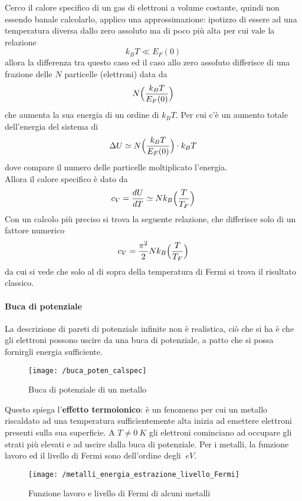 Cerco il calore specifico di un gas di elettroni a volume costante, quindi non essendo banale calcolarlo, applico una approssimazione: ipotizzo di essere ad una temperatura diversa dallo zero assoluto ma di poco più alta per cui vale la relazione
$$k_B T \ll E_F(0)$$
allora la differenza tra questo caso ed il caso allo zero assoluto differisce di una frazione delle $N$ particelle (elettroni) data da 
\begin{equation}
N \Bigl(  \frac{k_B T}{E_F(0)}  \Bigr)
\end{equation}
che aumenta la sua energia di un ordine di $k_BT$.
Per cui c'è un aumento totale dell'energia del sistema di
\begin{equation}
\Delta U \simeq N \Bigl(  \frac{k_B T}{E_F(0)}  \Bigr) \cdot k_B T
\end{equation}
dove compare il numero delle particelle moltiplicato l'energia. \\
Allora il calore specifico è dato da
\begin{equation}
c_V =  \frac{dU}{dT} \simeq N k_B \Bigl(  \frac{T}{T_F}  \Bigr)
\end{equation}
Con un calcolo più preciso si trova la seguente relazione, che differisce solo di un fattore numerico
\begin{equation}
c_V = \frac{\pi^2}{2} N k_B \Bigl(  \frac{T}{T_F}  \Bigr)
\end{equation}
da cui si vede che solo al di sopra della temperatura di Fermi si trova il risultato classico.

\paragraph{Buca di potenziale}
La descrizione di pareti di potenziale infinite non è realistica, ciò che si ha è che gli elettroni possono uscire da una buca di potenziale, a patto che si possa fornirgli energia sufficiente.

\begin{figure}[h]
\centering
\texttt{[image: /buca\_poten\_calspec]}
\caption{Buca di potenziale di un metallo}
\end{figure}

Questo spiega l'\textbf{effetto termoionico}: è un fenomeno per cui un metallo riscaldato ad una temperatura sufficientemente alta inizia ad emettere elettroni presenti sulla sua superficie. 
A $T \not= \SI{0}{K} $ gli elettroni cominciano ad occupare gli strati più elevati e ad uscire dalla buca di potenziale.
Per i metalli, la funzione lavoro ed il livello di Fermi sono dell'ordine degli $\SI{}{eV}$.

\begin{figure}[h]
\centering
\texttt{[image: /metalli\_energia\_estrazione\_livello\_Fermi]}
\caption{Funzione lavoro e livello di Fermi di alcuni metalli}
\end{figure}








